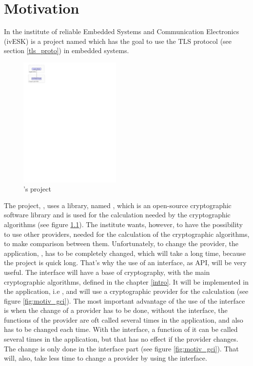 ﻿\chapter{Motivation}
\label{motiv}
In the institute of reliable Embedded Systems and Communication Electronics
(ivESK) is a project named \embtls which has the goal to use the TLS protocol
(see section \ref{tls_proto}) in embedded systems.

\begin{figure}[!ht]
\centering
\includegraphics[trim=0cm 23.25cm 15.25cm 0cm,
height=6.5cm]{figures/intro_embtls.pdf}
\caption{\embtls's project}
\label{fig:motiv_embtls}

\end{figure}

The project, \embtls, uses a library, named \tomcrypt, which is an open-source 
cryptographic software library and is used for the calculation needed by the
cryptographic algorithms (see figure \ref{fig:motiv_embtls}).
The institute wants, however, to have the possibility to use other providers,
needed for the calculation of the cryptographic algorithms, to make comparison
between them.
Unfortunately, to change the provider, the application, \embtls, has to be
completely changed, which will take a long time, because the project is quick
long.
That's why the use of an interface, as API, will be very useful.
The interface will have a base of cryptography, with the main
cryptographic algorithms, defined in the chapter \ref{intro}.
It will be implemented in the application, i.e \embtls, and will use a
cryptographic provider for the calculation (see figure \ref{fig:motiv_gci}).
The most important advantage of the use of the interface is when the change of a
provider has to be done, without the interface, the functions of the provider
are oft called several times in the application, and also has to be changed each time.
With the interface, a function of it can be called several times in the
application, but that has no effect if the provider changes. The
change is only done in the interface part (see figure \ref{fig:motiv_gci}).
That will, also, take less time to change a provider by using the interface.
 

